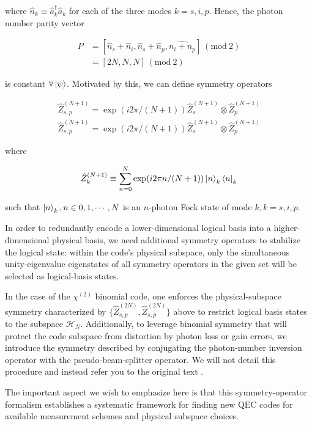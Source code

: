 \documentclass[12]{amsart}
\newcommand\0{\mathbf{0}}
\newcommand\<{\langle}
\renewcommand\>{\rangle}
\renewcommand\mod[1]{\ (\mathrm{mod}\ #1)}
\begin{document}
where $\hat{n}_k \equiv \hat{a}_k^\dag\hat{a}_k$ for each of the three modes $k = s, i, p$. Hence, the photon number parity vector

\begin{align*}
P &= [\hat{n}_s + \hat{n}_i, \hat{n}_s + \hat{n}_p, \hat{n_i + n_p}  ] \mod 2\\
&= [2N, N, N] \mod 2
\end{align*}

is constant $\forall \ket{\psi}$. Motivated by this, we can define symmetry operators 

\begin{align*}
\hat{Z}_{s, p}^{(N + 1)} = \exp(i 2 \pi / (N+1))	\hat{Z}_{s}^{(N + 1)} \otimes \hat{Z}_{p}^{(N + 1)} \\
\hat{Z}_{s, p}^{(N + 1)} = \exp(i 2 \pi / (N+1))	\hat{Z}_{s}^{(N + 1)} \otimes \hat{Z}_{p}^{(N + 1)}
\end{align*}

where

\begin{align*}
\hat{Z}_{k}^{(N + 1)} \equiv \sum_{n=0}^{N}\exp(i 2 \pi n / (N+1))	\ket{n}_k \bra{n}_k
\end{align*}

such that $\ket{n}_k, n \in 0, 1, \cdots, N$ is an $n$-photon Fock state of mode $k, k = s, i, p$.


In order to redundantly encode a lower-dimensional logical basis into a higher-dimensional physical basis, we need additional symmetry operators to stabilize the logical state: within the code’s physical subspace, only the simultaneous unity-eigenvalue eigenstates of all symmetry operators in the given set will be selected as logical-basis states.

In the case of the $\chi^{(2)}$ binomial code, one enforces the physical-subspace symmetry characterized by $\{ \hat{Z}_{s, p}^{(2N)}, \hat{Z}_{s, p}^{(2N)}\}$ above to restrict logical basis states to the subspace $\mathcal{H}_N$. Additionally, to leverage binomial symmetry that will protect the code subspace from distortion by photon loss or gain errors, we introduce the symmetry described by conjugating the photon-number inversion operator with the pseudo-beam-splitter operator. We will not detail this procedure and instead refer you to the original text \cite{niu2018hardware}.

The important aspect we wish to emphasize here is that this symmetry-operator formalism establishes a systematic framework for finding new QEC codes for available measurement schemes and physical subspace choices.
\end{document}
